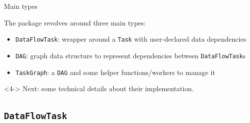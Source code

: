 \documentclass{beamer}
\begin{document}
\begin{frame}{Main types}

The package revolves around three main types:
\begin{itemize}
  \item <1->\texttt{DataFlowTask}: wrapper around a
  \texttt{Task} with user-declared data dependencies
  \item <2->\texttt{DAG}: graph data
  structure to represent dependencies between \texttt{DataFlowTask}s
  \item <3->\texttt{TaskGraph}: a
  \texttt{DAG} and some helper functions/workers to manage it

\end{itemize}

\begin{alertblock}<4->{}
  Next: some technical details about their
  implementation.
\end{alertblock}

\end{frame}

\subsection{\texttt{DataFlowTask}}
\end{document}
